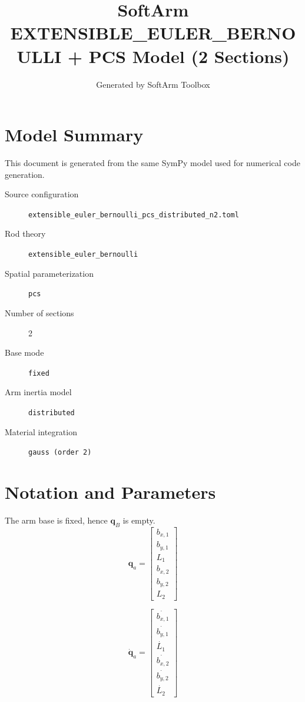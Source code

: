 \documentclass[11pt]{article}
\title{SoftArm EXTENSIBLE\_EULER\_BERNOULLI + PCS Model (2 Sections)}
\author{Generated by SoftArm Toolbox}
\date{}
\begin{document}
\maketitle

\section{Model Summary}
This document is generated from the same SymPy model used for numerical code generation.
\begin{description}
\item[Source configuration] \texttt{extensible\_euler\_bernoulli\_pcs\_distributed\_n2.toml}
\item[Rod theory] \texttt{extensible\_euler\_bernoulli}
\item[Spatial parameterization] \texttt{pcs}
\item[Number of sections] 2
\item[Base mode] \texttt{fixed}
\item[Arm inertia model] \texttt{distributed}
\item[Material integration] \texttt{gauss (order 2)}
\end{description}

\section{Notation and Parameters}
The arm base is fixed, hence $\boldsymbol q_B$ is empty.
\begin{equation}
\boldsymbol q_a=\begin{bmatrix}b_{x,1}\\b_{y,1}\\L_{1}\\b_{x,2}\\b_{y,2}\\L_{2}\end{bmatrix}
\end{equation}

\begin{equation}
\dot{\boldsymbol q}_a=\begin{bmatrix}\dot{b_{x,1}}\\\dot{b_{y,1}}\\\dot{L_{1}}\\\dot{b_{x,2}}\\\dot{b_{y,2}}\\\dot{L_{2}}\end{bmatrix}
\end{equation}
\end{document}
